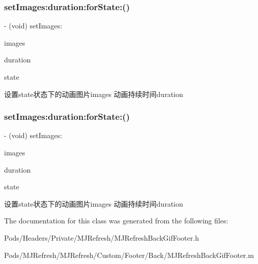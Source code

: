 \subsubsection{\texorpdfstring{set\+Images\+:duration\+:for\+State\+:()}{setImages:duration:forState:()}\hspace{0.1cm}{\footnotesize\ttfamily [2/3]}}
{\footnotesize\ttfamily -\/ (void) set\+Images\+: \begin{DoxyParamCaption}\item[{(N\+S\+Array $\ast$)}]{images }\item[{duration:(N\+S\+Time\+Interval)}]{duration }\item[{forState:(M\+J\+Refresh\+State)}]{state }\end{DoxyParamCaption}}

设置state状态下的动画图片images 动画持续时间duration \mbox{\label{interface_m_j_refresh_back_gif_footer_a77591768ea89ec5a912b0ca6c1c4dab8}} 
\subsubsection{\texorpdfstring{set\+Images\+:duration\+:for\+State\+:()}{setImages:duration:forState:()}\hspace{0.1cm}{\footnotesize\ttfamily [3/3]}}
{\footnotesize\ttfamily -\/ (void) set\+Images\+: \begin{DoxyParamCaption}\item[{(N\+S\+Array $\ast$)}]{images }\item[{duration:(N\+S\+Time\+Interval)}]{duration }\item[{forState:(M\+J\+Refresh\+State)}]{state }\end{DoxyParamCaption}}

设置state状态下的动画图片images 动画持续时间duration 

The documentation for this class was generated from the following files\+:\begin{DoxyCompactItemize}
\item 
Pods/\+Headers/\+Private/\+M\+J\+Refresh/M\+J\+Refresh\+Back\+Gif\+Footer.\+h\item 
Pods/\+M\+J\+Refresh/\+M\+J\+Refresh/\+Custom/\+Footer/\+Back/M\+J\+Refresh\+Back\+Gif\+Footer.\+m\end{DoxyCompactItemize}
